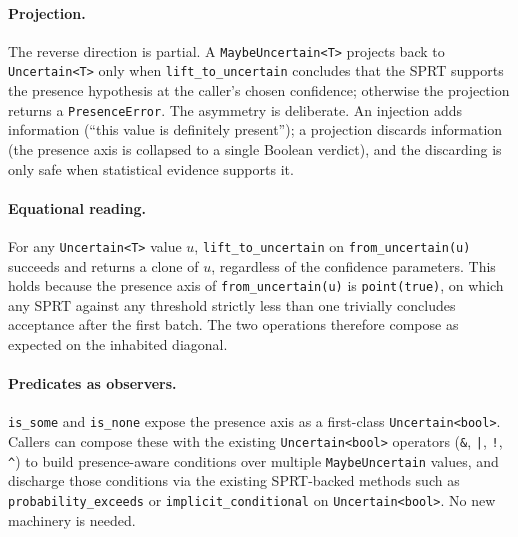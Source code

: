 \paragraph{Projection.} The reverse direction is partial. A
\texttt{MaybeUncertain<T>} projects back to \texttt{Uncertain<T>} only when
\texttt{lift\_to\_uncertain} concludes that the SPRT supports the presence
hypothesis at the caller's chosen confidence; otherwise the projection
returns a \texttt{PresenceError}. The asymmetry is deliberate. An injection
adds information (``this value is definitely present''); a projection
discards information (the presence axis is collapsed to a single Boolean
verdict), and the discarding is only safe when statistical evidence
supports it.

\paragraph{Equational reading.} For any \texttt{Uncertain<T>} value $u$,
\texttt{lift\_to\_uncertain} on \texttt{from\_uncertain(u)} succeeds and
returns a clone of $u$, regardless of the confidence parameters. This holds
because the presence axis of \texttt{from\_uncertain(u)} is
\texttt{point(true)}, on which any SPRT against any threshold strictly less
than one trivially concludes acceptance after the first batch. The two
operations therefore compose as expected on the inhabited diagonal.

\paragraph{Predicates as observers.} \texttt{is\_some} and \texttt{is\_none}
expose the presence axis as a first-class \texttt{Uncertain<bool>}. Callers
can compose these with the existing \texttt{Uncertain<bool>} operators
(\texttt{\&}, \texttt{|}, \texttt{!}, \texttt{\^{}}) to build presence-aware
conditions over multiple \texttt{MaybeUncertain} values, and discharge those
conditions via the existing SPRT-backed methods such as
\texttt{probability\_exceeds} or \texttt{implicit\_conditional} on
\texttt{Uncertain<bool>}. No new machinery is needed.
